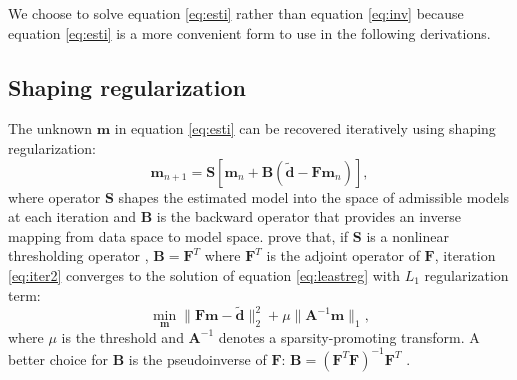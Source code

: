 We choose to solve equation \ref{eq:esti} rather than equation \ref{eq:inv} because equation \ref{eq:esti} is a more convenient form to use in the following derivations.

\subsection{Shaping regularization}

The unknown $\mathbf{m}$ in equation \ref{eq:esti} can be recovered iteratively using shaping regularization:
\begin{equation}
\label{eq:iter2}
\mathbf{m}_{n+1}=\mathbf{S}[\mathbf{m}_n+\mathbf{B}(\mathbf{\tilde{d}}-\mathbf{Fm}_n)],
\end{equation}
where operator $\mathbf{S}$ shapes the estimated model into the space of admissible models at each iteration \cite[]{fomel2,fomel3} and $\mathbf{B}$ is the backward operator that provides an inverse mapping from data space to model space.
\cite{daubechies} prove that, if $\mathbf{S}$ is a nonlinear thresholding operator \cite[]{donoho}, $\mathbf{B}=\mathbf{F}^T$ where $\mathbf{F}^T$ is the adjoint operator of $\mathbf{F}$, iteration \ref{eq:iter2} converges to the solution of equation \ref{eq:leastreg} with $L_1$ regularization term:
\begin{equation}
\label{eq:leastreg}
\min_{\mathbf{m}} \parallel \mathbf{Fm-\tilde{d}} \parallel_2^2 +\mu\parallel\mathbf{A}^{-1}\mathbf{m}\parallel_1,
\end{equation}
where $\mu$ is the threshold and $\mathbf{A}^{-1}$ denotes a sparsity-promoting transform. 
A better choice for $\mathbf{B}$ is the pseudoinverse of $\mathbf{F}$: $\mathbf{B}=(\mathbf{F}^T\mathbf{F})^{-1}\mathbf{F}^T$ \cite[]{daubechies2008}.

